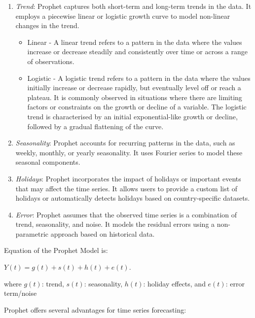 \documentclass[
]{article}
\begin{document}
\begin{enumerate}
\def\labelenumi{\arabic{enumi}.}
\item
  \emph{Trend}: Prophet captures both short-term and long-term trends in
  the data. It employs a piecewise linear or logistic growth curve to
  model non-linear changes in the trend.

  \begin{itemize}
  \item
    Linear - A linear trend refers to a pattern in the data where the
    values increase or decrease steadily and consistently over time or
    across a range of observations.
  \item
    Logistic - A logistic trend refers to a pattern in the data where
    the values initially increase or decrease rapidly, but eventually
    level off or reach a plateau. It is commonly observed in situations
    where there are limiting factors or constraints on the growth or
    decline of a variable. The logistic trend is characterised by an
    initial exponential-like growth or decline, followed by a gradual
    flattening of the curve.
  \end{itemize}
\item
  \emph{Seasonality}: Prophet accounts for recurring patterns in the
  data, such as weekly, monthly, or yearly seasonality. It uses Fourier
  series to model these seasonal components.
\item
  \emph{Holidays}: Prophet incorporates the impact of holidays or
  important events that may affect the time series. It allows users to
  provide a custom list of holidays or automatically detects holidays
  based on country-specific datasets.
\item
  \emph{Error}: Prophet assumes that the observed time series is a
  combination of trend, seasonality, and noise. It models the residual
  errors using a non-parametric approach based on historical data.
\end{enumerate}

Equation of the Prophet Model is:

\(Y(t) = g(t) + s(t) + h(t) + e(t)\).

where \(g(t)\): trend, \(s(t)\): seasonality, \(h(t)\): holiday effects,
and \(e(t)\): error term/noise

Prophet offers several advantages for time series forecasting:
\end{document}
